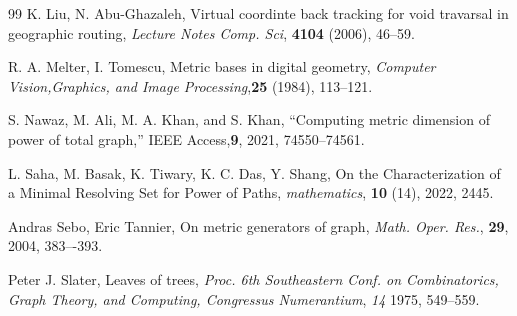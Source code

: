 \documentclass{article}
\theoremstyle{definition}
\numberwithin{equation}{section}
\begin{document}
\begin{thebibliography}{99}
K. Liu, N. Abu-Ghazaleh, Virtual coordinte back tracking for void travarsal in geographic routing, \textit{Lecture Notes Comp. Sci}, \textbf{4104} (2006), 46--59.

R. A. Melter, I. Tomescu, Metric bases in digital geometry, \textit{Computer Vision,Graphics, and Image Processing},\textbf{25} (1984), 113--121.

S. Nawaz, M. Ali, M. A. Khan, and S. Khan, “Computing
metric dimension of power of total graph,” IEEE Access,\textbf{9}, 2021, 74550–74561.

L. Saha, M. Basak, K. Tiwary, K. C. Das, Y. Shang, On the Characterization of a Minimal Resolving Set for Power of Paths, \textit{mathematics}, \textbf{10} (14), 2022, 2445.  


Andras Sebo, Eric Tannier, On metric generators of graph, \textit{Math.
Oper. Res.}, \textbf{29}, 2004, 383–-393.

Peter J. Slater, Leaves of trees, \textit{Proc. 6th Southeastern Conf. on Combinatorics, Graph Theory, and Computing, Congressus Numerantium}, \textit{14} 1975, 549--559.


\end{thebibliography}
\end{document}
